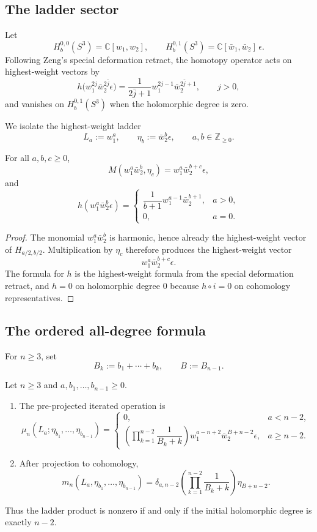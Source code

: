 \subsection{The ladder sector}

Let
\[
H_b^{0,0}(S^3)=\mathbb{C}[w_1,w_2],
\qquad
H_b^{0,1}(S^3)=\mathbb{C}[\bar w_1,\bar w_2]\,\epsilon.
\]
Following Zeng's special deformation retract, the homotopy operator acts on highest-weight vectors by
\[
h\bigl(w_1^{2j}\bar w_2^{2\bar j}\epsilon\bigr)
=
\frac{1}{2\bar j+1}w_1^{2j-1}\bar w_2^{2\bar j+1},
\qquad j>0,
\]
and vanishes on $H_b^{0,1}(S^3)$ when the holomorphic degree is zero.

We isolate the highest-weight ladder
\[
L_a:=w_1^a,
\qquad
\eta_b:=\bar w_2^b\epsilon,
\qquad a,b\in \mathbb Z_{\ge0}.
\]

\begin{lemma}
For all $a,b,c\ge0$,
\[
M(w_1^a\bar w_2^b,\eta_c)=w_1^a\bar w_2^{b+c}\epsilon,
\]
and
\[
h(w_1^a\bar w_2^b\epsilon)=
\begin{cases}
\dfrac{1}{b+1}w_1^{a-1}\bar w_2^{b+1}, & a>0,\\[1ex]
0, & a=0.
\end{cases}
\]
\end{lemma}

\begin{proof}
The monomial $w_1^a\bar w_2^b$ is harmonic, hence already the highest-weight vector of $H_{a/2,b/2}$. Multiplication by $\eta_c$ therefore produces the highest-weight vector
\[
w_1^a\bar w_2^{b+c}\epsilon.
\]
The formula for $h$ is the highest-weight formula from the special deformation retract, and $h=0$ on holomorphic degree $0$ because $h\circ i=0$ on cohomology representatives.
\end{proof}

\subsection{The ordered all-degree formula}

For $n\ge3$, set
\[
B_k:=b_1+\cdots+b_k,
\qquad
B:=B_{n-1}.
\]

\begin{theorem}
Let $n\ge3$ and $a,b_1,\dots,b_{n-1}\ge0$.
\begin{enumerate}[label=\textup{(\roman*)},leftmargin=2em]
\item The pre-projected iterated operation is
\[
\mu_n(L_a;\eta_{b_1},\dots,\eta_{b_{n-1}})
=
\begin{cases}
0, & a<n-2,\\[2ex]
\left(\prod_{k=1}^{n-2}\dfrac{1}{B_k+k}\right)
w_1^{a-n+2}\bar w_2^{B+n-2}\epsilon, & a\ge n-2.
\end{cases}
\]
\item After projection to cohomology,
\[
m_n(L_a,\eta_{b_1},\dots,\eta_{b_{n-1}})
=
\delta_{a,n-2}
\left(\prod_{k=1}^{n-2}\frac{1}{B_k+k}\right)\eta_{B+n-2}.
\]
\end{enumerate}
Thus the ladder product is nonzero if and only if the initial holomorphic degree is exactly $n-2$.
\end{theorem}

